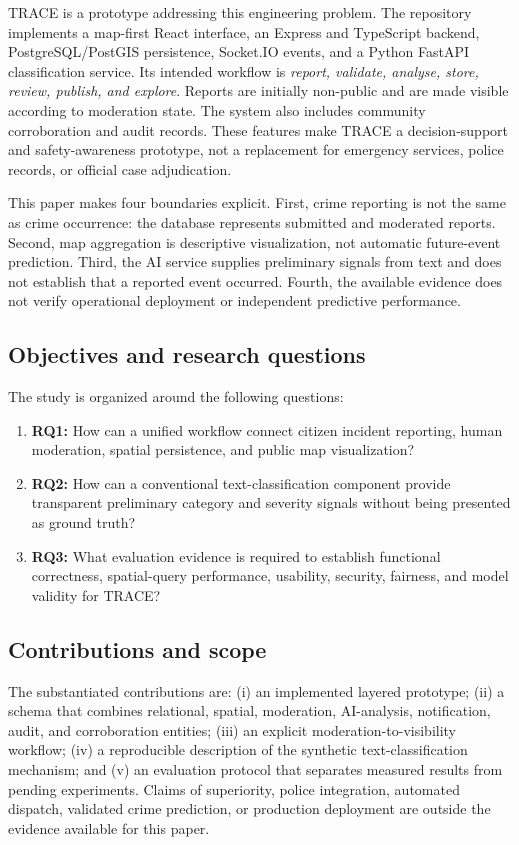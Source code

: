 \documentclass[11pt]{article}
\begin{document}
TRACE is a prototype addressing this engineering problem. The repository
implements a map-first React interface, an Express and TypeScript backend,
PostgreSQL/PostGIS persistence, Socket.IO events, and a Python FastAPI
classification service. Its intended workflow is
\emph{report, validate, analyse, store, review, publish, and explore}.
Reports are initially non-public and are made visible according to
moderation state. The system also includes community corroboration and audit
records. These features make TRACE a decision-support and safety-awareness
prototype, not a replacement for emergency services, police records, or
official case adjudication.

This paper makes four boundaries explicit. First, crime reporting is not the
same as crime occurrence: the database represents submitted and moderated
reports. Second, map aggregation is descriptive visualization, not automatic
future-event prediction. Third, the AI service supplies preliminary signals
from text and does not establish that a reported event occurred. Fourth, the
available evidence does not verify operational deployment or independent
predictive performance.

\subsection{Objectives and research questions}
\label{sec:rqs}

The study is organized around the following questions:
\begin{enumerate}
  \item \textbf{RQ1:} How can a unified workflow connect citizen incident
  reporting, human moderation, spatial persistence, and public map
  visualization?
  \item \textbf{RQ2:} How can a conventional text-classification component
  provide transparent preliminary category and severity signals without
  being presented as ground truth?
  \item \textbf{RQ3:} What evaluation evidence is required to establish
  functional correctness, spatial-query performance, usability, security,
  fairness, and model validity for TRACE?
\end{enumerate}

\subsection{Contributions and scope}

The substantiated contributions are: (i) an implemented layered prototype;
(ii) a schema that combines relational, spatial, moderation, AI-analysis,
notification, audit, and corroboration entities; (iii) an explicit
moderation-to-visibility workflow; (iv) a reproducible description of the
synthetic text-classification mechanism; and (v) an evaluation protocol that
separates measured results from pending experiments. Claims of superiority,
police integration, automated dispatch, validated crime prediction, or
production deployment are outside the evidence available for this paper.
\end{document}
